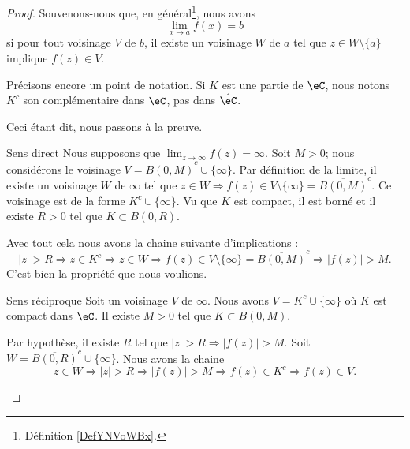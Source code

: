 \begin{proof}
    Souvenons-nous que, en général\footnote{Définition \ref{DefYNVoWBx}.}, nous avons
    \begin{equation}
        \lim_{x\to a} f(x)=b
    \end{equation}
    si pour tout voisinage \( V\) de \( b\), il existe un voisinage \( W\) de \( a\) tel que \( z\in W\setminus\{ a \}\) implique \( f(z)\in V\).

    Précisons encore un point de notation. Si \( K\) est une partie de \( \eC\), nous notons \( K^c\) son complémentaire dans \( \eC\), pas dans \( \hat  \eC\).

    Ceci étant dit, nous passons à la preuve.
    \begin{subproof}
        \item[Sens direct]
            Nous supposons que \( \lim_{z\to \infty} f(z)=\infty\). Soit \( M>0\); nous considérons le voisinage \( V=\overline{ B(0,M) }^c\cup\{ \infty \}\). Par définition de la limite, il existe un voisinage \( W\) de \( \infty\) tel que \( z\in W\Rightarrow f(z)\in V\setminus\{ \infty \}=\overline{ B(0,M) }^c\). Ce voisinage est de la forme \( K^c\cup\{ \infty \}\). Vu que \( K\) est compact, il est borné et il existe \( R>0\) tel que \( K\subset B(0,R)\).

            Avec tout cela nous avons la chaine suivante d'implications :
            \begin{equation}
                | z |>R\Rightarrow z\in K^c\Rightarrow z\in W\Rightarrow f(z)\in V\setminus\{ \infty \}=\overline{ B(0,M) }^c\Rightarrow | f(z) |>M.
            \end{equation}
            C'est bien la propriété que nous voulions.
        \item[Sens réciproque]
            Soit un voisinage \( V\) de \( \infty\). Nous avons \( V=K^c\cup\{ \infty \}\) où \( K\) est compact dans \( \eC\). Il existe \( M>0\) tel que \( K\subset B(0,M)\).

            Par hypothèse, il existe \( R\) tel que \( | z |>R\Rightarrow | f(z) |>M\). Soit \( W=\overline{ B(0,R) }^c\cup\{ \infty \}\). Nous avons la chaine
            \begin{equation}
                z\in W\Rightarrow| z |>R\Rightarrow| f(z) |>M\Rightarrow f(z)\in K^c\Rightarrow f(z)\in V.
            \end{equation}
    \end{subproof}
\end{proof}

